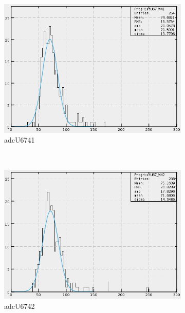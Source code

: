 \begin{figure}[h]
    \centering
    \begin{subfigure}[h]{0.3\textwidth}
        \centering
        \includegraphics[width=\textwidth, keepaspectratio = true]{adcU67_41}
        \caption{adcU6741}
        \label{fig:adcU67_41}
    \end{subfigure}
    ~
    \begin{subfigure}[h]{0.3\textwidth}
        \centering
        \includegraphics[width=\textwidth, keepaspectratio = true]{adcU67_42}
        \caption{adcU6742}
        \label{fig:adcU67_42}
    \end{subfigure}
    ~
    \begin{subfigure}[h]{0.3\textwidth}
        \centering

\end{subfigure}
\end{figure}
